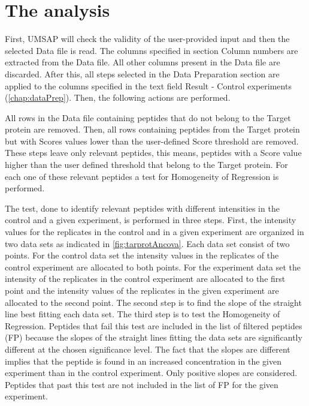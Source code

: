 \section{The analysis}

First, UMSAP will check the validity of the user-provided input and then the selected
Data file is read. The columns specified in section Column numbers are extracted
from the Data file. All other columns present in the Data file are discarded. After
this, all steps selected in the Data Preparation section are applied to the columns
specified in the text field Result - Control experiments (\autoref{chap:dataPrep}).
Then, the following actions are performed.

All rows in the Data file containing peptides that do not belong to the Target protein
are removed. Then, all rows containing peptides from the Target protein but with
Scores values lower than the user-defined Score threshold are removed. These steps
leave only relevant peptides, this means, peptides with a Score value higher than
the user defined threshold that belong to the Target protein. For each one of these
relevant peptides a test for Homogeneity of Regression \cite{ancova} is performed.

The test, \label{par:tarprotAncovaTest} done to identify relevant peptides with
different intensities in the control and a given experiment, is performed in three
steps. First, the intensity values for the replicates in the control and in a given
experiment are organized in two data sets as indicated in \autoref{fig:tarprotAncova}.
Each data set consist of two points. For the control data set the intensity values
in the replicates of the control experiment are allocated to both points. For the
experiment data set the intensity of the replicates in the control experiment are
allocated to the first point and the intensity values of the replicates in the given
experiment are allocated to the second point. The second step is to find the slope
of the straight line best fitting each data set. The third step is to test the
Homogeneity of Regression. Peptides that fail this test are included in the list of
filtered peptides (FP) because the slopes of the straight lines fitting the data
sets are significantly different at the chosen significance level. The fact that
the slopes are different implies that the peptide is found in an increased
concentration in the given experiment than in the control experiment. Only positive
slopes are considered. Peptides that past this test are not included in the list of
FP for the given experiment. 
\newpage

